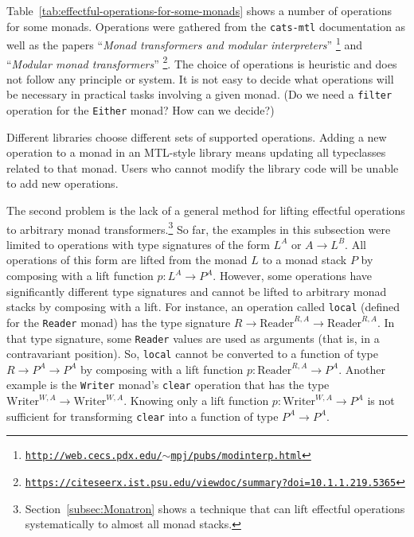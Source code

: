 Table~\ref{tab:effectful-operations-for-some-monads} shows a number
of operations for some monads. Operations were gathered from the \texttt{cats-mtl}
documentation as well as the papers \textsf{``}\emph{Monad transformers and
modular interpreters}\textsf{''} \footnote{\texttt{\href{http://web.cecs.pdx.edu/~mpj/pubs/modinterp.html}{http://web.cecs.pdx.edu/$\sim$mpj/pubs/modinterp.html}}}
and \textsf{``}\emph{Modular monad transformers}\textsf{''} \footnote{\texttt{\href{https://citeseerx.ist.psu.edu/viewdoc/summary?doi=10.1.1.219.5365}{https://citeseerx.ist.psu.edu/viewdoc/summary?doi=10.1.1.219.5365}}}.
The choice of operations is heuristic and does not follow any principle
or system. It is not easy to decide what operations will be necessary
in practical tasks involving a given monad. (Do we need a \lstinline!filter!
operation for the \lstinline!Either! monad? How can we decide?) 

Different libraries choose different sets of supported operations.
Adding a new operation to a monad in an MTL-style library means updating
all typeclasses related to that monad. Users who cannot modify the
library code will be unable to add new operations.

The second problem is the lack of a general method for lifting effectful
operations to arbitrary monad transformers.\footnote{Section~\ref{subsec:Monatron} shows a technique that can lift effectful
operations systematically to almost all monad stacks.} So far, the examples in this subsection were limited to operations
with type signatures of the form $L^{A}$ or $A\rightarrow L^{B}$.
All operations of this form are lifted from the monad $L$ to a monad
stack $P$ by composing with a lift function $p:L^{A}\rightarrow P^{A}$.
However, some operations have significantly different type signatures
and cannot be lifted to arbitrary monad stacks by composing with a
lift. For instance, an operation called \lstinline!local! (defined
for the \lstinline!Reader! monad) has the type signature $R\rightarrow\text{Reader}^{R,A}\rightarrow\text{Reader}^{R,A}$.
In that type signature, some \lstinline!Reader! values are used as
arguments (that is, in a contravariant position). So, \lstinline!local!
cannot be converted to a function of type $R\rightarrow P^{A}\rightarrow P^{A}$
by composing with a lift function $p:\text{Reader}^{R,A}\rightarrow P^{A}$.
Another example is the \lstinline!Writer! monad\textsf{'}s \lstinline!clear!
operation that has the type $\text{Writer}^{W,A}\rightarrow\text{Writer}^{W,A}$.
Knowing only a lift function $p:\text{Writer}^{W,A}\rightarrow P^{A}$
is not sufficient for transforming \lstinline!clear! into a function
of type $P^{A}\rightarrow P^{A}$.

